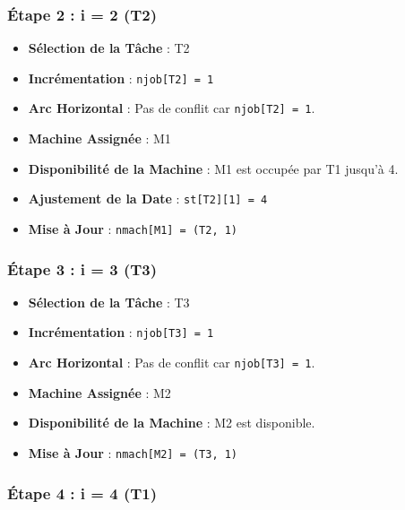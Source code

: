 \documentclass[12pt]{article}
\begin{document}
\subsubsection{Étape 2 : i = 2 (T2)}

\begin{itemize}
    \item \textbf{Sélection de la Tâche} : T2
    \item \textbf{Incrémentation} : \texttt{njob[T2] = 1}
    \item \textbf{Arc Horizontal} : Pas de conflit car \texttt{njob[T2] = 1}.
    \item \textbf{Machine Assignée} : M1
    \item \textbf{Disponibilité de la Machine} : M1 est occupée par T1 jusqu'à 4.
    \item \textbf{Ajustement de la Date} : \texttt{st[T2][1] = 4}
    \item \textbf{Mise à Jour} : \texttt{nmach[M1] = (T2, 1)}
\end{itemize}

\subsubsection{Étape 3 : i = 3 (T3)}

\begin{itemize}
    \item \textbf{Sélection de la Tâche} : T3
    \item \textbf{Incrémentation} : \texttt{njob[T3] = 1}
    \item \textbf{Arc Horizontal} : Pas de conflit car \texttt{njob[T3] = 1}.
    \item \textbf{Machine Assignée} : M2
    \item \textbf{Disponibilité de la Machine} : M2 est disponible.
    \item \textbf{Mise à Jour} : \texttt{nmach[M2] = (T3, 1)}
\end{itemize}

\subsubsection{Étape 4 : i = 4 (T1)}
\end{document}
